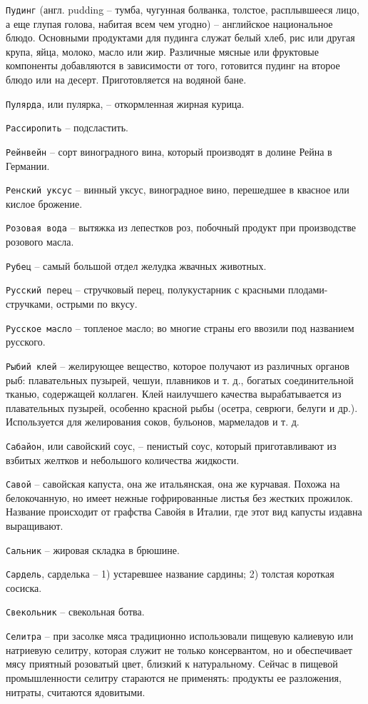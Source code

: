 {\tt Пудинг} (англ. pudding – тумба, чугунная болванка, толстое, расплывшееся лицо, а еще глупая голова, набитая всем чем угодно) – английское национальное блюдо. Основными продуктами для пудинга служат белый хлеб, рис или другая крупа, яйца, молоко, масло или жир. Различные мясные или фруктовые компоненты добавляются в зависимости от того, готовится пудинг на второе блюдо или на десерт. Приготовляется на водяной бане.

{\tt Пулярда}, или пулярка, – откормленная жирная курица.

{\tt Рассиропить} – подсластить. 

{\tt Рейнвейн} – сорт виноградного вина, который производят в долине Рейна в Германии. 

{\tt Ренский уксус} – винный уксус, виноградное вино, перешедшее в квасное или кислое брожение. 

{\tt Розовая вода} – вытяжка из лепестков роз, побочный продукт при производстве розового масла.

{\tt Рубец} – самый большой отдел желудка жвачных животных. 

{\tt Русский перец} – стручковый перец, полукустарник с красными плодами-стручками, острыми по вкусу.

{\tt Русское масло} – топленое масло; во многие страны его ввозили под названием русского. 

{\tt Рыбий клей} – желирующее вещество, которое получают из различных органов рыб: плавательных пузырей, чешуи, плавников и т. д., богатых соединительной тканью, содержащей коллаген. Клей наилучшего качества вырабатывается из плавательных пузырей, особенно красной рыбы (осетра, севрюги, белуги и др.). Используется для желирования соков, бульонов, мармеладов и т. д.

{\tt Сабайон}, или савойский соус, – пенистый соус, который приготавливают из взбитых желтков и небольшого количества жидкости. 

{\tt Савой} – савойская капуста, она же итальянская, она же курчавая. Похожа на белокочанную, но имеет нежные гофрированные листья без жестких прожилок. Название происходит от графства Савойя в Италии, где этот вид капусты издавна выращивают. 

{\tt Сальник} – жировая складка в брюшине.

{\tt Сардель}, сарделька – 1) устаревшее название сардины; 2) толстая короткая сосиска. 

{\tt Свекольник} – свекольная ботва.

{\tt Селитра} – при засолке мяса традиционно использовали пищевую калиевую или натриевую селитру, которая служит не только консервантом, но и обеспечивает мясу приятный розоватый цвет, близкий к натуральному. Сейчас в пищевой промышленности селитру стараются не применять: продукты ее разложения, нитраты, считаются ядовитыми.

